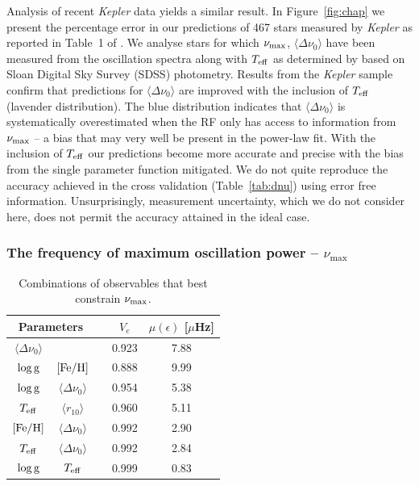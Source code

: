 Analysis of recent \emph{Kepler} data yields a similar result. In Figure~\ref{fig:chap} we present the percentage error in our predictions of 467 stars measured by \emph{Kepler} as reported in Table~1 of \citet{2014ApJS..210....1C}. We analyse stars for which $\nu_{\rm{max}}$, $\langle\Delta\nu_0\rangle$ have been measured from the oscillation spectra along with  $T_{\rm{eff}}$ as determined by \citet{2012ApJS..199...30P} based on Sloan Digital Sky Survey (SDSS) photometry. Results from the \emph{Kepler} sample confirm that predictions for $\langle\Delta\nu_0\rangle$ are improved with the inclusion of $T_{\rm{eff}}$ (lavender distribution). The blue distribution indicates that $\langle\Delta\nu_0\rangle$ is systematically overestimated when the RF only has access to information from $\nu_{\rm{max}}$ -- a bias that may very well be present in the power-law fit. With the inclusion of $T_{\rm{eff}}$ our predictions become more accurate and precise with the bias from the single parameter function mitigated. We do not quite reproduce the accuracy achieved in the cross validation (Table~\ref{tab:dnu}) using error free information.  Unsurprisingly,  measurement uncertainty, which we do not consider here, does not permit the accuracy attained in the ideal case.





\subsubsection*{The frequency of maximum oscillation power -- $\nu_{\max}$} 

\begin{table}
\centering
\caption{Combinations of observables that  best constrain $\nu_{\rm{max}}$.}
    \begin{tabular}{ccccc}
\hline    \hline
\multicolumn{2}{c}{Parameters} && $V_e$ &$\mu (\epsilon)$ [$\mu$Hz] \\ \hline 
$\langle\Delta\nu_0\rangle$ &&&0.923  & 7.88 \\
$\log \rm{g}$ & $[\rm{Fe/H}]$ && 0.888 & 9.99 \\
$\log \rm{g}$     & $\langle\Delta\nu_0\rangle$     &&0.954  & 5.38\\
$T_{\rm{eff}}$     & $\langle r_{10}\rangle$ &   &0.960  & 5.11\\
$[\rm{Fe/H}]$    &$\langle\Delta\nu_0\rangle$        &       &0.992  & 2.90\\
$T_{\rm{eff}}$     & $\langle\Delta\nu_0\rangle$    &  &0.992  & 2.84\\
$\log \rm{g}$  & $T_{\rm{eff}}$                 &&0.999  & 0.83\\
\hline
    \end{tabular}
    \label{tab:nmx}
\end{table}

